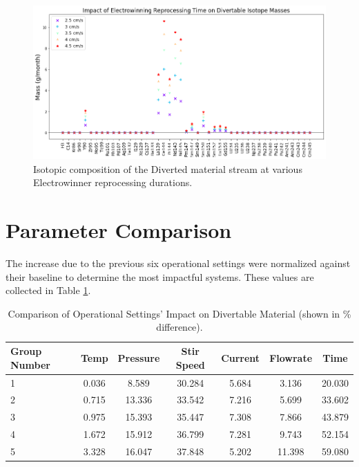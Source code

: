 \begin{figure}
	\includegraphics[width=\linewidth]{images/time-sa-diff}
	\caption{Isotopic composition of the Diverted material stream at various Electrowinner reprocessing durations.}
	\label{fig:win-time-diff}
\end{figure}

\section{Parameter Comparison}

The increase due to the previous six operational settings were normalized against their baseline
to determine the most impactful systems. These values are collected in Table \ref{tab:compare}.

\begin{table}[h]
	\centering
	\begin{tabularx}{\linewidth}{lcccccc}
		\hline
		\textbf{Group Number} & \textbf{Temp} & \textbf{Pressure} & \textbf{Stir Speed} & \textbf{Current}
		& \textbf{Flowrate} & \textbf{Time} \\
		\hline \hline
		1 & 0.036 & 8.589 & 30.284 & 5.684 & 3.136 & 20.030 \\ \hline
		2 & 0.715 & 13.336 & 33.542 & 7.216 & 5.699 & 33.602 \\ \hline
		3 & 0.975 & 15.393 & 35.447 & 7.308 & 7.866 & 43.879 \\ 
		4 & 1.672 & 15.912 & 36.799 & 7.281 & 9.743 & 52.154 \\ \hline
		5 & 3.328 & 16.047 & 37.848 & 5.202 & 11.398 & 59.080 \\ \hline
	\end{tabularx}
	\caption {Comparison of Operational Settings' Impact on Divertable Material (shown in
		\% difference).}
	\label {tab:compare}
\end{table}

